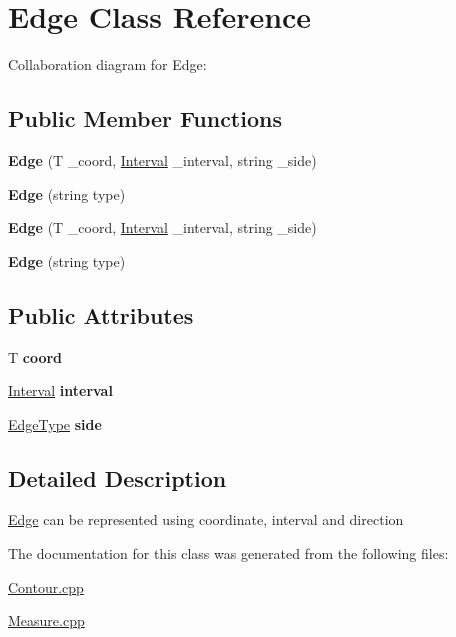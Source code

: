 \hypertarget{classEdge}{}\section{Edge Class Reference}
\label{classEdge}


Collaboration diagram for Edge\+:
\subsection*{Public Member Functions}
\begin{DoxyCompactItemize}
\item 
\mbox{\label{classEdge_a788a653e9c866b4578226fa26aeed82b}} 
{\bfseries Edge} (T \+\_\+coord, \hyperlink{classInterval}{Interval} \+\_\+interval, string \+\_\+side)
\item 
\mbox{\label{classEdge_ad9f71495b6725a6d1ebd114e338a413b}} 
{\bfseries Edge} (string type)
\item 
\mbox{\label{classEdge_a788a653e9c866b4578226fa26aeed82b}} 
{\bfseries Edge} (T \+\_\+coord, \hyperlink{classInterval}{Interval} \+\_\+interval, string \+\_\+side)
\item 
\mbox{\label{classEdge_ad9f71495b6725a6d1ebd114e338a413b}} 
{\bfseries Edge} (string type)
\end{DoxyCompactItemize}
\subsection*{Public Attributes}
\begin{DoxyCompactItemize}
\item 
\mbox{\label{classEdge_a9135fbe9d02327917295da09c9241288}} 
T {\bfseries coord}
\item 
\mbox{\label{classEdge_aea4b96c270f7cf0ab157747898cd9d6b}} 
\hyperlink{classInterval}{Interval} {\bfseries interval}
\item 
\mbox{\label{classEdge_a096ec5b8d15bcd30e53226ebc29c9753}} 
\hyperlink{classEdgeType}{Edge\+Type} {\bfseries side}
\end{DoxyCompactItemize}


\subsection{Detailed Description}
\hyperlink{classEdge}{Edge} can be represented using coordinate, interval and direction 

The documentation for this class was generated from the following files\+:\begin{DoxyCompactItemize}
\item 
\hyperlink{Contour_8cpp}{Contour.\+cpp}\item 
\hyperlink{Measure_8cpp}{Measure.\+cpp}\end{DoxyCompactItemize}
